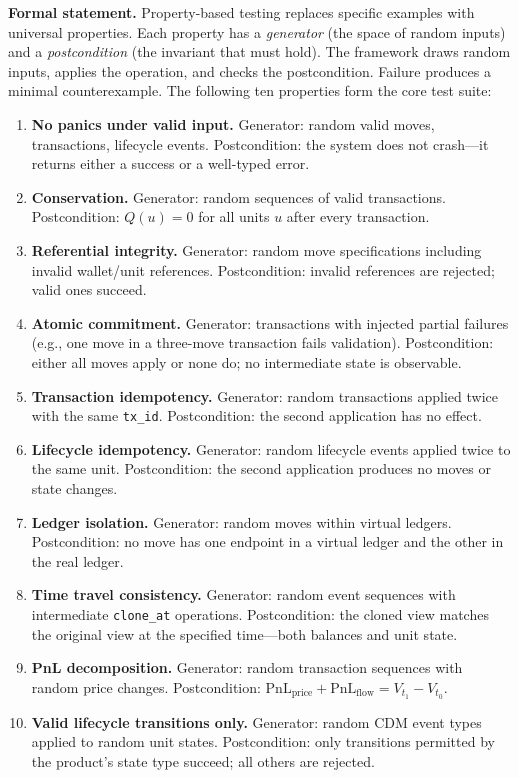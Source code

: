 \documentclass[11pt,a4paper]{article}
\begin{document}
\noindent\textbf{Formal statement.} Property-based testing replaces specific examples with universal properties. Each property has a \textit{generator} (the space of random inputs) and a \textit{postcondition} (the invariant that must hold). The framework draws random inputs, applies the operation, and checks the postcondition. Failure produces a minimal counterexample. The following ten properties form the core test suite:

\begin{enumerate}
\item \textbf{No panics under valid input.} Generator: random valid moves, transactions, lifecycle events. Postcondition: the system does not crash---it returns either a success or a well-typed error.

\item \textbf{Conservation.} Generator: random sequences of valid transactions. Postcondition: $Q(u) = 0$ for all units $u$ after every transaction.

\item \textbf{Referential integrity.} Generator: random move specifications including invalid wallet/unit references. Postcondition: invalid references are rejected; valid ones succeed.

\item \textbf{Atomic commitment.} Generator: transactions with injected partial failures (e.g., one move in a three-move transaction fails validation). Postcondition: either all moves apply or none do; no intermediate state is observable.

\item \textbf{Transaction idempotency.} Generator: random transactions applied twice with the same \texttt{tx\_id}. Postcondition: the second application has no effect.

\item \textbf{Lifecycle idempotency.} Generator: random lifecycle events applied twice to the same unit. Postcondition: the second application produces no moves or state changes.

\item \textbf{Ledger isolation.} Generator: random moves within virtual ledgers. Postcondition: no move has one endpoint in a virtual ledger and the other in the real ledger.

\item \textbf{Time travel consistency.} Generator: random event sequences with intermediate \texttt{clone\_at} operations. Postcondition: the cloned view matches the original view at the specified time---both balances and unit state.

\item \textbf{PnL decomposition.} Generator: random transaction sequences with random price changes. Postcondition: $\text{PnL}_{\text{price}} + \text{PnL}_{\text{flow}} = V_{t_1} - V_{t_0}$.

\item \textbf{Valid lifecycle transitions only.} Generator: random CDM event types applied to random unit states. Postcondition: only transitions permitted by the product's state type succeed; all others are rejected.
\end{enumerate}
\end{document}
